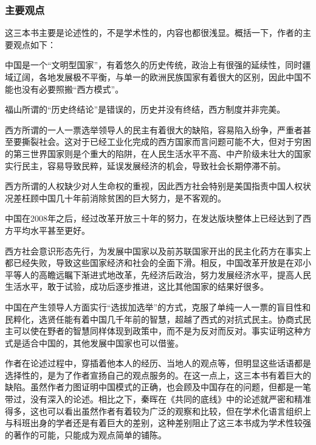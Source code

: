 \subsubsection{主要观点}

这三本书主要是论述性的，不是学术性的，内容也都很浅显。概括一下，作者的主要观点如下：
\begin{itemize*}
	\item 中国是一个“文明型国家”，有着悠久的历史传统，政治上有很强的延续性，同时疆域辽阔，各地发展极不平衡，与单一的欧洲民族国家有着很大的区别，因此中国不能也没有必要照搬“西方模式”。
	\item 福山所谓的“历史终结论”是错误的，历史并没有终结，西方制度并非完美。
	\item 西方所谓的一人一票选举领导人的民主有着很大的缺陷，容易陷入纷争，严重者甚至要撕裂社会。这对于已经工业化完成的西方国家而言问题可能不大，但对于穷困的第三世界国家则是个重大的陷阱，在人民生活水平不高、中产阶级未壮大的国家实行民主，容易导致民粹，延误发展经济的机会，导致社会长期停滞不前。
	\item 西方所谓的人权缺少对人生命权的重视，因此西方社会特别是美国指责中国人权状况差枉顾中国几十年前消除贫困的巨大努力，是不客观的。
	\item 中国在2008年之后，经过改革开放三十年的努力，在发达版块整体上已经达到了西方平均水平甚至更好。
	\item 西方社会意识形态先行，为发展中国家以及前苏联国家开出的民主化药方在事实上都已经失败，导致这些国家经济和社会的全面下滑。相反，中国改革开放是在邓小平等人的高瞻远瞩下渐进式地改革，先经济后政治，努力发展经济水平，提高人民生活水平，敢于试验，成功后逐步推进，这比其他国家的结果好很多。
	\item 中国在产生领导人方面实行“选拔加选举”的方式，克服了单纯一人一票的盲目性和民粹化，选贤任能有着中国几千年前的智慧，超越了西式的对抗式民主。协商式民主可以使在野者的智慧同样体现到政策中，而不是为反对而反对。事实证明这种方式是适合中国的，其他发展中国家也可以借鉴。
\end{itemize*}

作者在论述过程中，穿插着他本人的经历、当地人的观点等，但明显这些话语都是选择性的，是为了作者宣扬自己的观点服务的。在这一点上，这三本书有着巨大的缺陷。虽然作者力图证明中国模式的正确，也会顾及中国存在的问题，但都是一笔带过，没有深入的论述。相比之下，秦晖在《共同的底线》中的论述就严密和精准得多，这也可以看出虽然作者有着较为广泛的观察和比较，但在学术化语言组织上与科班出身的学者还是有着巨大的差别，这种差别阻止了这三本书成为学术性较强的著作的可能，只能成为观点简单的铺陈。

